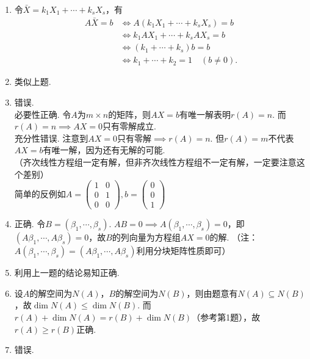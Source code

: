 \begin{enumerate}
\begin{enumerate}
            \item
                令$\bar{X}=k_1X_1+\cdots+k_sX_s$，有
                \begin{align*}
                    A\bar{X}=b&\iff A(k_1X_1+\cdots+k_sX_s)=b\\
                    &\iff k_1AX_1+\cdots+k_sAX_s=b\\
                    &\iff (k_1+\cdots+k_s)b=b\\
                    &\iff k_1+\cdots+k_2=1\quad (b\neq 0).
                \end{align*}
            \item 类似上题.
            \item
                错误.\\
                必要性正确. 令$A$为$m\times n$的矩阵，则$AX=b$有唯一解表明$r(A)=n$. 而$r(A)=n\implies AX=0$只有零解成立.\\
                充分性错误. 注意到$AX=0$只有零解$\implies r(A)=n$. 但$r(A)=m$不代表$AX=b$有唯一解，因为还有无解的可能.\\
                （齐次线性方程组一定有解，但非齐次线性方程组不一定有解，一定要注意这个差别）\\
                简单的反例如$A=\begin{pmatrix}
                    1 & 0 \\
                    0 & 1 \\
                    0 & 0
                \end{pmatrix},b=\begin{pmatrix}
                    0 \\
                    0 \\
                    1
                \end{pmatrix}$
            \item
                正确. 令$B=(\beta_1,\cdots,\beta_s)$. $AB=0\implies A(\beta_1,\cdots,\beta_s)=0$，即$(A\beta_1, \cdots, A\beta_s)=0$，故$B$的列向量为方程组$AX=0$的解.
                （注：$A(\beta_1,\cdots,\beta_s)=(A\beta_1, \cdots, A\beta_s)$利用分块矩阵性质即可）
            \item 利用上一题的结论易知正确.
            \item 设$A$的解空间为$N(A)$，$B$的解空间为$N(B)$，则由题意有$N(A)\subseteq N(B)$，故$\dim{N(A)}\leqslant \dim{N(B)}$. 而$r(A)+\dim{N(A)}=r(B)+\dim{N(B)}$（参考第1题），故$r(A)\geqslant r(B)$正确.
            \item
                错误.\\

\end{enumerate}
\end{enumerate}
